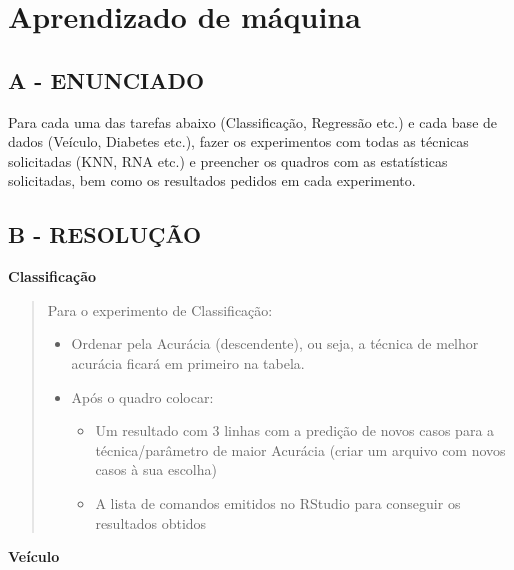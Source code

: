 \label{ap:ap08}
\chapter{Aprendizado de máquina}
\section*{\textbf{A - ENUNCIADO}}
Para cada uma das tarefas abaixo (Classificação, Regressão etc.) e cada base de dados (Veículo, Diabetes etc.), fazer os
experimentos com todas as técnicas solicitadas (KNN, RNA etc.) e preencher os quadros com as estatísticas solicitadas,
bem como os resultados pedidos em cada experimento.

\section*{\textbf{B - RESOLUÇÃO}}
\begin{adjustwidth}{1em}{}
\textbf{Classificação}
\end{adjustwidth}

\begin{quote}
Para o experimento de Classificação:
\begin{itemize}
    \item Ordenar pela Acurácia (descendente), ou seja, a técnica de melhor
acurácia ficará em primeiro na tabela.
    \item Após o quadro colocar:
    \begin{itemize}
        \item Um resultado com 3 linhas com a predição de novos casos para a
técnica/parâmetro de maior Acurácia (criar um arquivo com novos casos à
sua escolha)
        \item A lista de comandos emitidos no RStudio para conseguir os resultados
obtidos
    \end{itemize}
\end{itemize}
\end{quote}

\begin{center}
    \textbf{Veículo}
\end{center}


